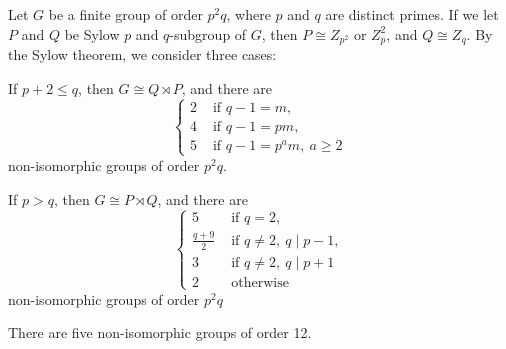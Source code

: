 \documentclass{../note}
\begin{document}
\begin{prb}
Let $G$ be a finite group of order $p^2q$, where $p$ and $q$ are distinct primes.
If we let $P$ and $Q$ be Sylow $p$ and $q$-subgroup of $G$, then $P\cong Z_{p^2}\text{ or }Z_p^2$, and $Q\cong Z_q$.
By the Sylow theorem, we consider three cases:
\begin{parts}
\item If $p+2\le q$, then $G\cong Q\rtimes P$, and there are
\[\begin{cases}
2&\text{ if }q-1=m,\\
4&\text{ if }q-1=pm,\\
5&\text{ if }q-1=p^am,\ a\ge2
\end{cases}\]
non-isomorphic groups of order $p^2q$.
\item If $p>q$, then $G\cong P\rtimes Q$, and there are
\[\begin{cases}
5&\text{ if }q=2,\\
\frac{q+9}2&\text{ if }q\ne2,\ q\mid p-1,\\
3&\text{ if }q\ne2,\ q\mid p+1\\
2&\text{ otherwise }
\end{cases}\]
non-isomorphic groups of order $p^2q$
\item There are five non-isomorphic groups of order 12.
\end{parts}
\end{prb}
\end{document}
